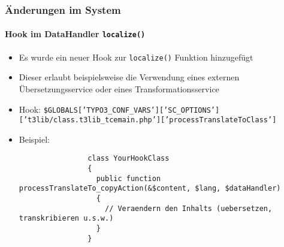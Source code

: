 \begin{frame}[fragile]
	\frametitle{Änderungen im System}
	\framesubtitle{Hook im DataHandler \texttt{localize()}}

	\lstset{basicstyle=\tiny\ttfamily}

	\begin{itemize}
		\item Es wurde ein neuer Hook zur \texttt{localize()} Funktion hinzugefügt
		\item Dieser erlaubt beispielsweise die Verwendung eines externen Übersetzungsservice oder eines Transformationsservice
	\end{itemize}

	\begin{itemize}
		\item Hook:\newline
			\smaller
				\texttt{\$GLOBALS['TYPO3\_CONF\_VARS']['SC\_OPTIONS']\newline
				\tabto{0.4cm}['t3lib/class.t3lib\_tcemain.php']['processTranslateToClass']}
			\normalsize

		\item Beispiel:

			\begin{lstlisting}
				class YourHookClass
				{
				  public function processTranslateTo_copyAction(&$content, $lang, $dataHandler)
				  {
				    // Veraendern den Inhalts (uebersetzen, transkribieren u.s.w.)
				  }
				}
			\end{lstlisting}
	\end{itemize}

\end{frame}









